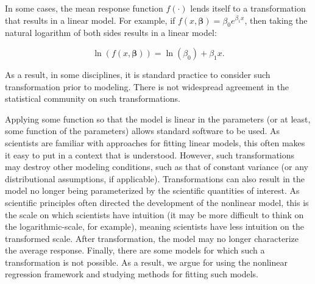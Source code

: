 \documentclass[
  letterpaper,
  DIV=11,
  numbers=noendperiod]{scrreprt}
\theoremstyle{definition}
\theoremstyle{definition}
\theoremstyle{remark}
\begin{document}
\begin{tcolorbox}[enhanced jigsaw, left=2mm, toprule=.15mm, arc=.35mm, breakable, opacitybacktitle=0.6, opacityback=0, rightrule=.15mm, colbacktitle=quarto-callout-note-color!10!white, coltitle=black, leftrule=.75mm, toptitle=1mm, colframe=quarto-callout-note-color-frame, titlerule=0mm, title=\textcolor{quarto-callout-note-color}{\faInfo}\hspace{0.5em}{Note}, bottomrule=.15mm, colback=white, bottomtitle=1mm]

In some cases, the mean response function \(f(\cdot)\) lends itself to a
transformation that results in a linear model. For example, if
\(f(x, \boldsymbol{\beta}) = \beta_0 e^{\beta_1 x}\), then taking the
natural logarithm of both sides results in a linear model:

\[\ln\left(f(x, \boldsymbol{\beta})\right) = \ln\left(\beta_0\right) + \beta_1 x.\]

As a result, in some disciplines, it is standard practice to consider
such transformation prior to modeling. There is not widespread agreement
in the statistical community on such transformations.

Applying some function so that the model is linear in the parameters (or
at least, some function of the parameters) allows standard software to
be used. As scientists are familiar with approaches for fitting linear
models, this often makes it easy to put in a context that is understood.
However, such transformations may destroy other modeling conditions,
such as that of constant variance (or any distributional assumptions, if
applicable). Transformations can also result in the model no longer
being parameterized by the scientific quantities of interest. As
scientific principles often directed the development of the nonlinear
model, this is the scale on which scientists have intuition (it may be
more difficult to think on the logarithmic-scale, for example), meaning
scientists have less intuition on the transformed scale. After
transformation, the model may no longer characterize the average
response. Finally, there are some models for which such a transformation
is not possible. As a result, we argue for using the nonlinear
regression framework and studying methods for fitting such models.

\end{tcolorbox}
\end{document}
